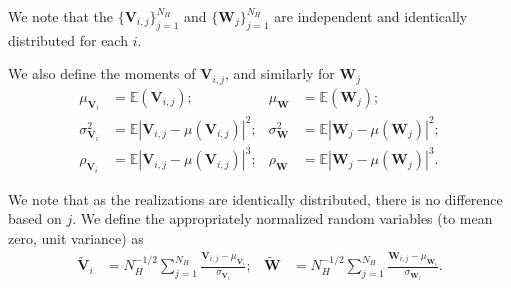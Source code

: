 \documentclass{report}
\begin{document}
We note that the $\{\bm{V}_{i,j}\}_{j=1}^{N_H}$ and $\{\bm{W}_{j}\}_{j=1}^{N_H}$ are independent and identically distributed for each $i$. %

We also define the moments of  $\bm{V}_{i,j}$, and similarly for $\bm{W}_j$
\begin{align}
\label{eq:moments1_def}
\mu_{\bm{V}_{i}}       & = \mathbb{E}(\bm{V}_{i,j}); & \mu_{\bm{W}}       & = \mathbb{E}(\bm{W}_{j});\\
\label{eq:moments2_def}
\sigma^2_{\bm{V}_{i}} & = \mathbb{E}|\bm{V}_{i,j} - \mu(\bm{V}_{i,j})|^2; & \sigma^2_{\bm{W}} & = \mathbb{E}|\bm{W}_{j} - \mu(\bm{W}_{j})|^2;\\
\label{eq:moments3_def}
\rho_{\bm{V}_{i}}     & = \mathbb{E}|\bm{V}_{i,j} - \mu(\bm{V}_{i,j})|^3; & \rho_{\bm{W}}     & = \mathbb{E}|\bm{W}_{j} - \mu(\bm{W}_{j})|^3.
\end{align}

We note that as the realizations are identically distributed, there is no difference based on $j$. We define the appropriately normalized random variables (to mean zero, unit variance) as
\begin{align}
\label{eq:tilde_def}
\tilde{\bm{V}}_{i} &= N_H^{-1/2}\mathop{\sum}\limits_{j=1}^{N_H}\frac{\bm{V}_{i,j} - \mu_{\bm{V}_i}}{\sigma_{\bm{V}_{i}}}; & \tilde{\bm{W}} &= N_H^{-1/2}\mathop{\sum}\limits_{j=1}^{N_H}\frac{\bm{W}_{i,j} - \mu_{\bm{W}_i}}{\sigma_{\bm{W}_{i}}}.
\end{align}
\end{document}
